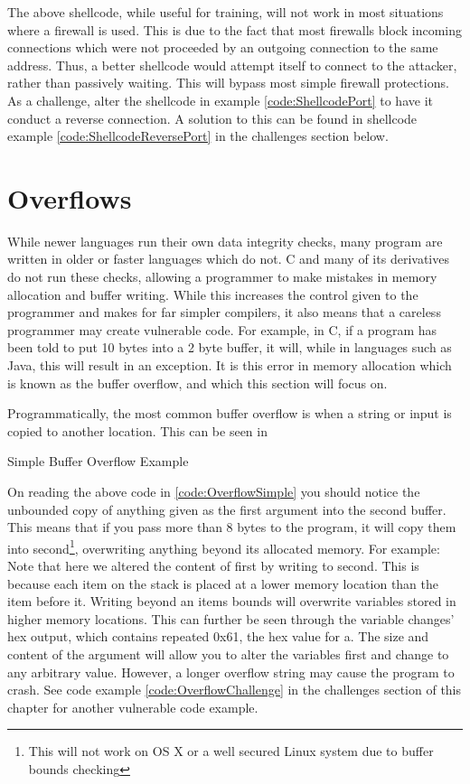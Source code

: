 				The above shellcode, while useful for training, will not work in most situations where a firewall is used.
				This is due to the fact that most firewalls block incoming connections which were not proceeded by an outgoing connection to the same address.
				Thus, a better shellcode would attempt itself to connect to the attacker, rather than passively waiting.
				This will bypass most simple firewall protections.
				As a challenge, alter the shellcode in example \ref{code:ShellcodePort} to have it conduct a reverse connection.
				A solution to this can be found in shellcode example \ref{code:ShellcodeReversePort} in the challenges section below.

	\section{Overflows}
		While newer languages run their own data integrity checks, many program are written in older or faster languages which do not.
		C and many of its derivatives do not run these checks, allowing a programmer to make mistakes in memory allocation and buffer writing.
		While this increases the control given to the programmer and makes for far simpler compilers, it also means that a careless programmer may create vulnerable code.
		For example, in C, if a program has been told to put 10 bytes into a 2 byte buffer, it will, while in languages such as Java, this will result in an exception.
		It is this error in memory allocation which is known as the buffer overflow, and which this section will focus on.

		Programmatically, the most common buffer overflow is when a string or input is copied to another location. This can be seen in %
		\begin{code}
			\caption{Simple Buffer Overflow Example}
			\label{code:OverflowSimple}
		\end{code}
			On reading the above code in \ref{code:OverflowSimple} you should notice the unbounded copy of anything given as the first argument into the second buffer.
			This means that if you pass more than 8 bytes to the program, it will copy them into second\footnote{This will not work on OS X or a well secured Linux system due to buffer bounds checking}, overwriting anything beyond its allocated memory.
			For example:
			Note that here we altered the content of first by writing to second.
			This is because each item on the stack is placed at a lower memory location than the item before it.
			Writing beyond an items bounds will overwrite variables stored in higher memory locations.
			This can further be seen through the variable changes' hex output, which contains repeated 0x61, the hex value for a.
			The size and content of the argument will allow you to alter the variables first and change to any arbitrary value.
			However, a longer overflow string may cause the program to crash.
			See code example \ref{code:OverflowChallenge} in the challenges section of this chapter for another vulnerable code example.

